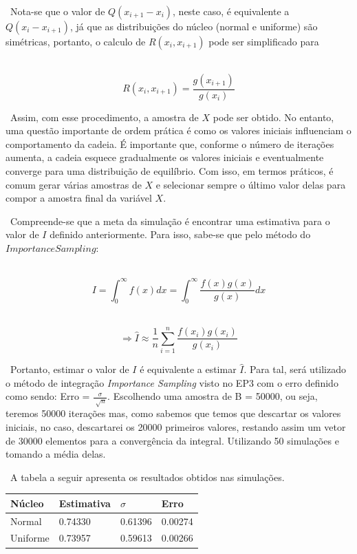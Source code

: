 \documentclass{article} %
\begin{document}
\ Nota-se que o valor de $Q(x_{i + 1} - x_{i})$, neste caso, é equivalente a $Q(x_{i} - x_{i + 1})$, já que as distribuições do núcleo (normal e uniforme) são simétricas, portanto, o calculo de $R(x_{i}, x_{i + 1})$ pode ser simplificado para

\ $$R(x_{i}, x_{i + 1}) = \frac{g(x_{i + 1})}{g(x_{i})}$$

\ Assim, com esse procedimento, a amostra de $X$ pode ser obtido. No entanto, uma questão importante de ordem prática é como os valores iniciais influenciam o comportamento da cadeia. É importante que, conforme o número de iterações aumenta, a cadeia esquece gradualmente os valores iniciais e eventualmente converge para uma distribuição de equilíbrio. Com isso, em termos práticos, é comum gerar várias amostras de $X$ e selecionar sempre o último valor delas para compor a amostra final da variável $X$.

\ Compreende-se que a meta da simulação é encontrar uma estimativa para o valor de $I$ definido anteriormente. Para isso, sabe-se que pelo método do $Importance Sampling$:

\ $$I = \int_{0}^{\infty} f(x) dx = \int_{0}^{\infty} \frac{f(x)g(x)}{g(x)} dx$$

\ $$\Rightarrow \hat{I} \approx \frac{1}{n} \sum_{i=1}^{n} \frac{f(x_{i})g(x_{i})}{g(x_{i})}$$

\ Portanto, estimar o valor de $I$ é equivalente a estimar $\hat{I}$. Para tal, será utilizado o método de integração {\it{Importance Sampling}} visto no EP3 com o erro definido como sendo: Erro = $\frac{\sigma}{\sqrt[]{n}}$. Escolhendo uma amostra de B = 50000, ou seja, teremos 50000 iterações mas, como sabemos que temos que descartar os valores iniciais, no caso, descartarei os 20000 primeiros valores, restando assim um vetor de 30000 elementos para a convergência da integral. Utilizando 50 simulações e tomando a média delas.

\ A tabela a seguir apresenta os resultados obtidos nas simulações.

\begin{table}[h]
\begin{center}
\begin{tabular}{llll}
\hline
Núcleo & Estimativa & $\sigma$ & Erro \\
\hline
Normal & 0.74330 & 0.61396 & 0.00274\\
Uniforme & 0.73957 & 0.59613 & 0.00266\\
\hline
\end{tabular}
\end{center}
\end{table}
\end{document}
